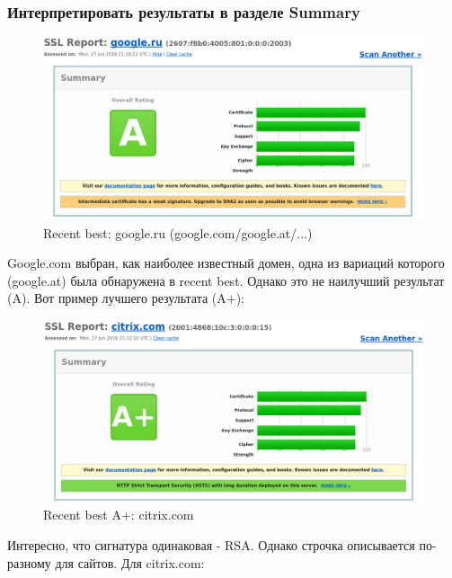 \documentclass[a4paper]{article}
\begin{document}
\subsubsection{Интерпретировать результаты в разделе Summary}

\begin{figure}[H]
	\begin{center}
		\includegraphics[scale=0.4]{pics/google.ru.png}
		\caption{Recent best: google.ru (google.com/google.at/...)} 
		\label{pic:pic_name}
	\end{center}
\end{figure}

Google.com выбран, как наиболее известный домен, одна из вариаций которого (google.at) была обнаружена в recent best. Однако это не наилучший результат (A). Вот пример лучшего результата (A+):

\begin{figure}[H]
	\begin{center}
		\includegraphics[scale=0.35]{pics/citrix.png}
		\caption{Recent best A+: citrix.com} 
		\label{pic:pic_name}
	\end{center}
\end{figure}

Интересно, что сигнатура одинаковая - RSA. Однако строчка описывается по-разному для сайтов. Для citrix.com:
\end{document}
